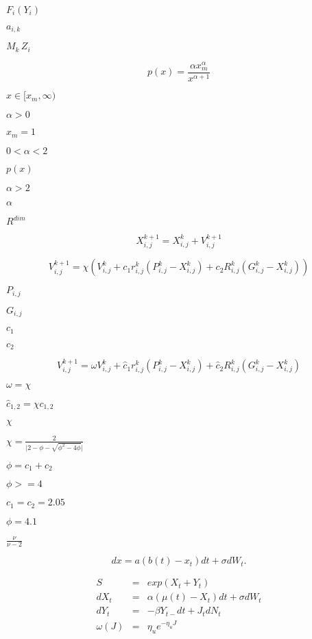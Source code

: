 \documentclass{article}
\begin{document}
$F_i(Y_i)$
\pagebreak

$ a_{i,k} $
\pagebreak

$ M_k\,Z_i$
\pagebreak

\[p(x) = \frac{\alpha x_m^{\alpha}}{x^{\alpha+1}}
\]
\pagebreak

$ x \in [x_m, \infty) $
\pagebreak

$ \alpha > 0 $
\pagebreak

$ x_m = 1 $
\pagebreak

$ 0 <
\alpha < 2 $
\pagebreak

$ p(x) $
\pagebreak

$ \alpha > 2 $
\pagebreak

$ \alpha $
\pagebreak

$ R^{dim} $
\pagebreak

\[X_{i, j}^{k+1} = X_{i, j}^k + V_{i, j}^{k+1}
\]
\pagebreak

\[V_{i, j}^{k+1} = \chi\left(V_{i, j}^k + c_1 r_{i, j}^k (P_{i, j}^k - X_{i, j}^k)
+ c_2 R_{i, j}^k (G_{i, j}^k - X_{i, j}^k)\right)
\]
\pagebreak

$ P_{i, j} $
\pagebreak

$ G_{i, j} $
\pagebreak

$ c_1 $
\pagebreak

$ c_2 $
\pagebreak

\[V_{i, j}^{k+1} = \omega V_{i, j}^k + \hat{c}_1 r_{i, j}^k (P_{i, j}^k - X_{i, j}^k)
+ \hat{c}_2 R_{i, j}^k (G_{i, j}^k - X_{i, j}^k)
\]
\pagebreak

$ \omega = \chi $
\pagebreak

$ \hat{c}_{1,2} = \chi c_{1,2} $
\pagebreak

$ \chi $
\pagebreak

$ \chi = \frac{2}{\vert 2-\phi-\sqrt{\phi^2 - 4\phi}\vert} $
\pagebreak

$ \phi = c_1 + c_2 $
\pagebreak

$ \phi >= 4 $
\pagebreak

$ c_1 = c_2 = 2.05 $
\pagebreak

$ \phi = 4.1 $
\pagebreak

$ \frac{\nu}{\nu-2}$
\pagebreak

\[    dx = a (b(t) - x_t) dt + \sigma dW_t.
\]
\pagebreak

\[\begin{array}{rcl}
S &=& exp(X_t + Y_t) \\
dX_t  &=& \alpha(\mu(t)-X_t)dt + \sigma dW_t \\
dY_t  &=& -\beta Y_{t-}dt + J_tdN_t \\
\omega(J)&=& \eta_u e^{-\eta_u J}
\end{array}
\]
\pagebreak
\end{document}
